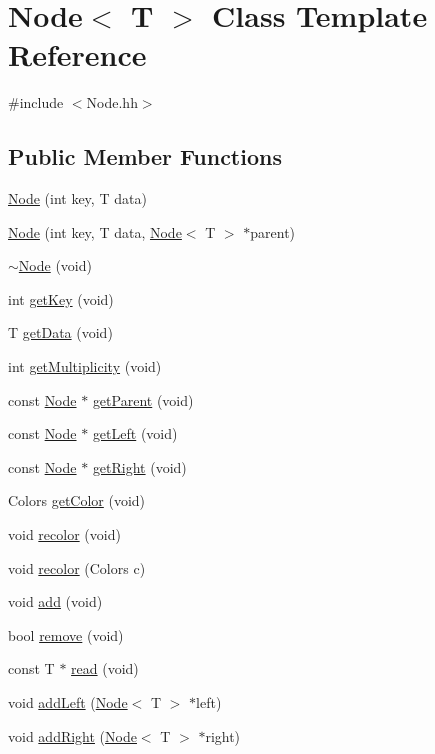 \hypertarget{class_node}{}\section{Node$<$ T $>$ Class Template Reference}
\label{class_node}


{\ttfamily \#include $<$Node.\+hh$>$}

\subsection*{Public Member Functions}
\begin{DoxyCompactItemize}
\item 
\hyperlink{class_node_a40d6e9db35a69683afc2a960f96c1109}{Node} (int key, T data)
\item 
\hyperlink{class_node_a2e3be75932d110fb2a52a3c297159f75}{Node} (int key, T data, \hyperlink{class_node}{Node}$<$ T $>$ $\ast$parent)
\item 
\hyperlink{class_node_a5fc413278a0bd22eb84e03c0ae90e22a}{$\sim$\+Node} (void)
\item 
int \hyperlink{class_node_a5ff3a3dd66edef87867616d1bc44838f}{get\+Key} (void)
\item 
T \hyperlink{class_node_ad89031c2899fe91646652ce4c2e79ab6}{get\+Data} (void)
\item 
int \hyperlink{class_node_ab83eb1cc81f91a5641693eb22712f8c8}{get\+Multiplicity} (void)
\item 
const \hyperlink{class_node}{Node} $\ast$ \hyperlink{class_node_a6a6c7c5376ee83e972ef5455b45143d5}{get\+Parent} (void)
\item 
const \hyperlink{class_node}{Node} $\ast$ \hyperlink{class_node_ac7fe9e26d77f45acdbf919adca86e843}{get\+Left} (void)
\item 
const \hyperlink{class_node}{Node} $\ast$ \hyperlink{class_node_a8dcc0a75395710d8c887d52daf72f2c8}{get\+Right} (void)
\item 
Colors \hyperlink{class_node_a9c209bbcd6a8c1e07914a0c6bea3a6f4}{get\+Color} (void)
\item 
void \hyperlink{class_node_a431de433a18f187a322ff5fe3ce39c9c}{recolor} (void)
\item 
void \hyperlink{class_node_a28b5a3622c4379faa722995c1ba01ae4}{recolor} (Colors c)
\item 
void \hyperlink{class_node_aef85f7c8d30881449f35ac5fda836438}{add} (void)
\item 
bool \hyperlink{class_node_a2f77a48dceae8b8268826483f9671e1a}{remove} (void)
\item 
const T $\ast$ \hyperlink{class_node_a565b1a8bbc88c67b5dbc6a78a11a4ba2}{read} (void)
\item 
void \hyperlink{class_node_a78c42d0d8acc20440279aa851c02b38e}{add\+Left} (\hyperlink{class_node}{Node}$<$ T $>$ $\ast$left)
\item 
void \hyperlink{class_node_ae0a74454b02ab98b6c373dea65ac441e}{add\+Right} (\hyperlink{class_node}{Node}$<$ T $>$ $\ast$right)
\end{DoxyCompactItemize}


